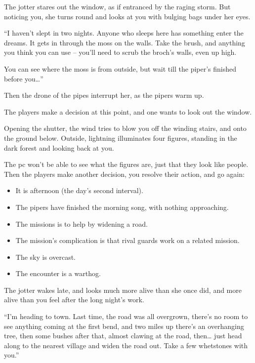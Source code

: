 \begin{multicols}{2}
\begin{boxtext}
  The \gls{jotter} stares out the window, as if entranced by the raging storm.
  But noticing you, she turns round and looks at you with bulging bags under her eyes.

  ``I haven't slept in two nights.
  Anyone who sleeps here has something enter the dreams.
  It gets in through the moss on the walls.
  Take the brush, and anything you think you can use -- you'll need to scrub the \gls{broch}'s walls, even up high.

  You can see where the moss is from outside, but wait till the piper's finished before you\ldots''

  Then the drone of the pipes interrupt her, as the pipers warm up.
\end{boxtext}

The players make a decision at this point, and one wants to look out the window.

\begin{boxtext}
  Opening the shutter, the wind tries to blow you off the winding stairs, and onto the ground below.
  Outside, lightning illuminates four figures, standing in the dark forest and looking back at you.
\end{boxtext}

The \gls{pc} won't be able to see what the figures are, just that they look like people.
Then the players make another decision, you resolve their action, and go again:

\begin{itemize}
  \item
  It is afternoon (the day's second \gls{interval}).
  \item
  The pipers have finished the morning song, with nothing approaching.
  \item
  The missions is to help  by widening a road.
  \item
  The mission's complication is that rival \glspl{guard} work on a related mission.
  \item
  The sky is overcast.
  \item
  The encounter is a warthog.
\end{itemize}

\begin{boxtext}
  The \gls{jotter} wakes late, and looks much more alive than she once did, and more alive than you feel after the long night's work.

  ``I'm heading to town.
  Last time, the road was all overgrown, there's no room to see anything coming at the first bend, and two miles up there's an overhanging tree, then some bushes after that, almost clawing at the road, then\ldots
  just head along to the nearest \gls{village} and widen the road out.
  Take a few whetstones with you.''


\end{boxtext}
\end{multicols}
